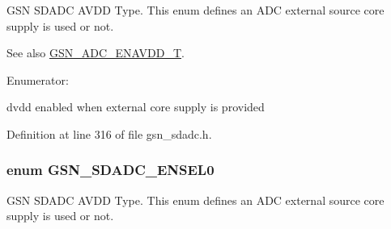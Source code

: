 GSN SDADC AVDD Type. This enum defines an ADC external source core supply is used or not. 

\begin{DoxySeeAlso}{See also}
\hyperlink{a00652_ga46353c29cf1b862e0ab85b39b68176af}{GSN\_\-ADC\_\-ENAVDD\_\-T}. 
\end{DoxySeeAlso}
\begin{Desc}
\item[Enumerator: ]\par
\begin{description}
\item[{\em 
\hypertarget{a00652_ggadec6c3ec131e3065cf2061534dfdb320ae124138038d5451c1ab715007e04a3de}{
GSN\_\-SDADC\_\-AVDD\_\-DISABLE}
\label{a00652_ggadec6c3ec131e3065cf2061534dfdb320ae124138038d5451c1ab715007e04a3de}
}]\item[{\em 
\hypertarget{a00652_ggadec6c3ec131e3065cf2061534dfdb320a296e895cfc98a59cc7db1267ea1ac740}{
GSN\_\-SDADC\_\-AVDD\_\-ENABLE}
\label{a00652_ggadec6c3ec131e3065cf2061534dfdb320a296e895cfc98a59cc7db1267ea1ac740}
}]dvdd enabled when external core supply is provided \end{description}
\end{Desc}



Definition at line 316 of file gsn\_\-sdadc.h.

\hypertarget{a00652_ga6258977695af5f9fbae5edbdc75d8387}{
\subsubsection[{GSN\_\-SDADC\_\-ENSEL0}]{\setlength{\rightskip}{0pt plus 5cm}enum {\bf GSN\_\-SDADC\_\-ENSEL0}}}
\label{a00652_ga6258977695af5f9fbae5edbdc75d8387}


GSN SDADC AVDD Type. This enum defines an ADC external source core supply is used or not. 


